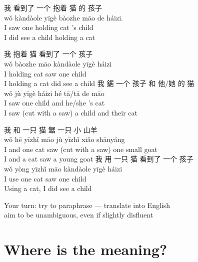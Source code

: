 \documentclass[a4paper,landscape,headrule,footrule,xetex,25pt]{foils}
\begin{document}
\begin{exe}
  \ex \glll 我 看到了 一个 抱着 猫 的 孩子 \\
  wǒ   kàndàole    yīgè   bàozhe  māo  de    háizi. \\
  I saw one holding cat 's child \\
  \trans I did see a child holding a cat

  \ex \glll 我 抱着 猫 看到了 一个 孩子 \\
  wǒ  bàozhe māo kàndàole  yīgè     háizi \\
  I holding cat saw one  child \\
 \trans I holding a cat did see a child
  \ex \glll 我 鋸  一个 孩子 和 他/她 的 猫 \\
wǒ jù  yīgè    háizi  hé  tā/tā   de māo \\
 I      saw    one    child   and     he/she  's cat\\
 \trans I saw  (cut with a saw) a child and their cat 

  \ex \glll 我 和 一只 猫 鋸 一只 小 山羊 \\
wǒ hē  yīzhǐ  māo jù yīzhǐ xiǎo  shānyáng  \\
I and one cat saw (cut with a saw) one small goat \\

\trans I and a cat saw a young goat
  \ex \glll 我 用 一只 猫 看到了 一个 孩子 \\
wǒ yòng yīzhǐ  māo kàndàole  yīgè  háizi \\
I use one cat saw one child \\
\trans Using a cat, I did see a child
\end{exe}

\bigskip
\begin{center} \large
  Your turn: try to paraphrase --- translate into English
  \\ aim to be unambiguous, even if slightly disfluent\task
\end{center}
\section{Where is the meaning?}

\end{document}
